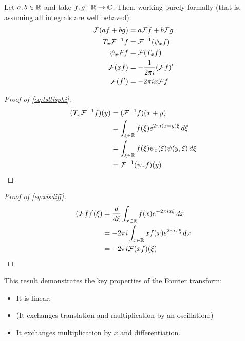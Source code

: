       \begin{lemma}
        \label{lemma:fourprops}
        Let $a,b\in\mathbb{R}$ and take $f,g:\mathbb{R}\rightarrow\mathbb{C}$.
        Then, working purely formally (that is, assuming all integrals are well behaved):
        \begin{align}
          \mathcal{F}(af + bg) &= a\mathcal{F} f + b\mathcal{F} g\\
          \label{eq:tsltisphi}
            T_x\mathcal{F}^{-1}f &= \mathcal{F}^{-1}(\psi_xf)\\
          \label{eq:tsltisphi2}
          \psi_x\mathcal{F} f &= \mathcal{F}(T_xf)\\
          \label{eq:xisdiff}
            \mathcal{F}(xf) &= -\frac{1}{2\pi i}(\mathcal{F} f)'\\
          \label{eq:xisdiff2}
            \mathcal{F}(f') &= -2\pi ix\mathcal{F} f
        \end{align}
        \begin{proof}[Proof of \eqref{eq:tsltisphi}]
          \begin{align*}
            (T_x\mathcal{F}^{-1}f)(y) &= (\mathcal{F}^{-1}f)(x+y)\\
            &= \int_{\xi\in\mathbb{R}}f(\xi)e^{2\pi i(x+y)\xi}\,d\xi\\
            &= \int_{\xi\in\mathbb{R}}f(\xi)\psi_x(\xi)\psi(y,\xi)\,d\xi\\
            &= \mathcal{F}^{-1}(\psi_xf)(y)
          \end{align*}
        \end{proof}
        \begin{proof}[Proof of \eqref{eq:xisdiff}]
          \begin{align*}
            (\mathcal{F} f)'(\xi) &= \frac{d}{d\xi}\int_{x\in\mathbb{R}} f(x)e^{-2\pi i x\xi}\,dx\\
            &= -2\pi i \int_{x\in\mathbb{R}} xf(x)e^{2\pi i x\xi}\,dx\\
            &= -2\pi i\mathcal{F}(xf)(\xi)
          \end{align*}
        \end{proof}
      \end{lemma}
      This result demonstrates the key properties of the Fourier transform:
      \begin{itemize}
        \item It is linear;
        \item (It exchanges translation and multiplication by an oscillation;) 
        \item It exchanges multiplication by $x$ and differentiation.
      \end{itemize}


